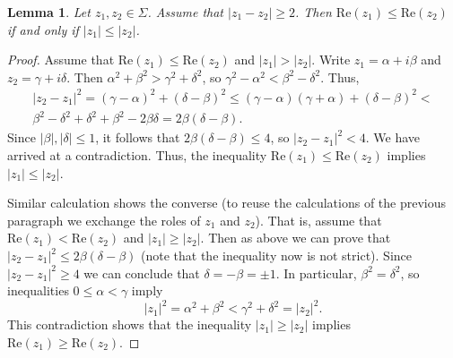 \documentclass{amsart}
\numberwithin{equation}{section}
\newtheorem{lemma}[theorem]{Lemma}
\theoremstyle{definition}
\theoremstyle{remark}
\begin{document}
	\begin{lemma}\label{lemComparisonInStrip}
		Let $z_1, z_2 \in \Sigma$. Assume that $|z_1 - z_2| \ge 2$. Then $\mathrm{Re}(z_1) \le \mathrm{Re}(z_2)$ if and only if $|z_1| \le |z_2|$.
	\end{lemma}
	\begin{proof}
		Assume that $\mathrm{Re}(z_1) \le \mathrm{Re}(z_2)$ and $|z_1| > |z_2|$. Write $z_1 = \alpha + i\beta$ and $z_2 = \gamma + i\delta$. Then $\alpha^2 + \beta^2 > \gamma^2 + \delta^2$, so $\gamma^2 - \alpha^2 < \beta^2 - \delta^2$. Thus, 
		\begin{multline*}
			|z_2 - z_1|^2 = (\gamma - \alpha)^2 + (\delta - \beta)^2 \le (\gamma - \alpha)(\gamma + \alpha) + (\delta - \beta)^2 < \\   \beta^2 - \delta^2 +  \delta^2+ \beta^2 - 2\beta \delta = 2\beta(\delta - \beta) .
		\end{multline*}
		Since $|\beta|, |\delta| \le 1$, it follows that $2\beta(\delta - \beta) \le 4$, so $|z_2 - z_1|^2 < 4$. We have arrived at a contradiction. Thus, the inequality $\mathrm{Re}(z_1) \le \mathrm{Re}(z_2)$ implies $|z_1| \le |z_2|$.
		
		Similar calculation shows the converse (to reuse the calculations of the previous paragraph we exchange the roles of $z_1$ and $z_2$). That is, assume that $\mathrm{Re}(z_1) < \mathrm{Re}(z_2)$ and $|z_1| \ge |z_2|$. Then as above we can prove that $|z_2 - z_1|^2 \le 2\beta(\delta - \beta)$ (note that the inequality now is not strict). Since $|z_2 - z_1|^2 \ge 4$ we can conclude that $\delta = -\beta = \pm 1$. In particular, $\beta^2 = \delta^2$, so inequalities $0 \le \alpha < \gamma$ imply
		\[
		|z_1|^2 = \alpha^2 + \beta^2 < \gamma^2 + \delta^2 = |z_2|^2.
		\]
		This contradiction shows that the inequality $|z_1| \ge |z_2|$ implies $\mathrm{Re}(z_1) \ge \mathrm{Re}(z_2)$.
	\end{proof}
	
\end{document}
